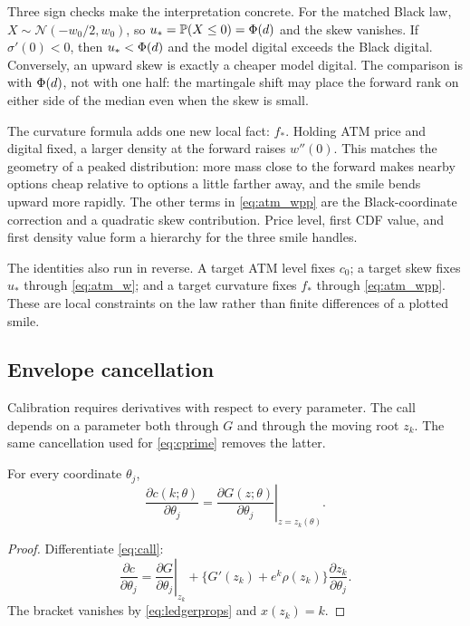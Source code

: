 Three sign checks make the interpretation concrete.  For the matched Black
law, $X\sim\mathcal N(-w_0/2,w_0)$, so
$u_*=\mathbb{P}(X\le0)=\Phi(d)$ and the skew vanishes.  If
$\sigma'(0)<0$, then $u_*<\Phi(d)$ and the model digital exceeds the Black
digital.  Conversely, an upward skew is exactly a cheaper model digital.
The comparison is with $\Phi(d)$, not with one half: the martingale shift may
place the forward rank on either side of the median even when the skew is
small.

The curvature formula adds one new local fact: $f_*$.  Holding ATM price and
digital fixed, a larger density at the forward raises $w''(0)$.  This matches
the geometry of a peaked distribution: more mass close to the forward makes
nearby options cheap relative to options a little farther away, and the smile
bends upward more rapidly.  The other terms in \eqref{eq:atm_wpp} are the
Black-coordinate correction and a quadratic skew contribution.  Price level,
first CDF value, and first density value form a hierarchy for the three smile
handles.

The identities also run in reverse.  A target ATM level fixes $c_0$; a target
skew fixes $u_*$ through \eqref{eq:atm_w}; and a target curvature fixes $f_*$
through \eqref{eq:atm_wpp}.  These are local constraints on the law rather
than finite differences of a plotted smile.

\subsection{Envelope cancellation}
\label{sec:jacobian}

Calibration requires derivatives with respect to every parameter.  The call
depends on a parameter both through $G$ and through the moving root $z_k$.
The same cancellation used for \eqref{eq:cprime} removes the latter.

\begin{theorem}
\label{thm:envelope}
For every coordinate $\theta_j$,
\begin{equation}
\frac{\partial c(k;\theta)}{\partial\theta_j}
=\left.\frac{\partial G(z;\theta)}{\partial\theta_j}
\right|_{z=z_k(\theta)}.
\label{eq:envelope}
\end{equation}
\end{theorem}

\begin{proof}
Differentiate \eqref{eq:call}:
\[
\frac{\partial c}{\partial\theta_j}
=\left.\frac{\partial G}{\partial\theta_j}\right|_{z_k}
+\{G'(z_k)+e^k\rho(z_k)\}\frac{\partial z_k}{\partial\theta_j}.
\]
The bracket vanishes by \eqref{eq:ledgerprops} and $x(z_k)=k$.
\end{proof}

